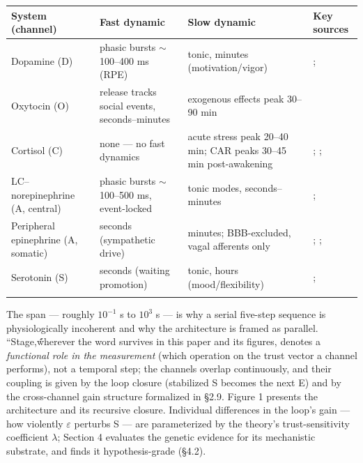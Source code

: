 \documentclass[
]{article}
\newcounter{none} %
\begin{document}
{\def\LTcaptype{none} %
\begin{longtable}[]{@{}
  >{\raggedright\arraybackslash}p{}
  >{\raggedright\arraybackslash}p{}
  >{\raggedright\arraybackslash}p{}
  >{\raggedright\arraybackslash}p{}@{}}
\toprule\noalign{}
\begin{minipage}[b]{\linewidth}\raggedright
System (channel)
\end{minipage} & \begin{minipage}[b]{\linewidth}\raggedright
Fast dynamic
\end{minipage} & \begin{minipage}[b]{\linewidth}\raggedright
Slow dynamic
\end{minipage} & \begin{minipage}[b]{\linewidth}\raggedright
Key sources
\end{minipage} \\
\midrule\noalign{}
\endhead
\bottomrule\noalign{}
\endlastfoot
Dopamine (D) & phasic bursts \(\sim\)100--400 ms (RPE) & tonic, minutes
(motivation/vigor) & ; \\
Oxytocin (O) & release tracks social events, seconds--minutes &
exogenous effects peak 30--90 min & \\
Cortisol (C) & none --- no fast dynamics & acute stress peak 20--40 min;
CAR peaks 30--45 min post-awakening & ; ; \\
LC--norepinephrine (A, central) & phasic bursts \(\sim\)100--500 ms,
event-locked & tonic modes, seconds--minutes & ; \\
Peripheral epinephrine (A, somatic) & seconds (sympathetic drive) &
minutes; BBB-excluded, vagal afferents only & ; ; \\
Serotonin (S) & seconds (waiting promotion) & tonic, hours
(mood/flexibility) & ; \\
& & & \\
\end{longtable}
}

The span --- roughly \(10^{-1}\) s to \(10^{3}\) s --- is why a serial
five-step sequence is physiologically incoherent and why the
architecture is framed as parallel. ``Stage,ẃ́herever the word survives
in this paper and its figures, denotes a \emph{functional role in the
measurement} (which operation on the trust vector a channel performs),
not a temporal step; the channels overlap continuously, and their
coupling is given by the loop closure (stabilized S becomes the next E)
and by the cross-channel gain structure formalized in §2.9. Figure 1
presents the architecture and its recursive closure. Individual
differences in the loop's gain --- how violently \(\varepsilon\)
perturbs S --- are parameterized by the theory's trust-sensitivity
coefficient \(\lambda\); Section 4 evaluates the genetic evidence for
its mechanistic substrate, and finds it hypothesis-grade (§4.2).
\end{document}
